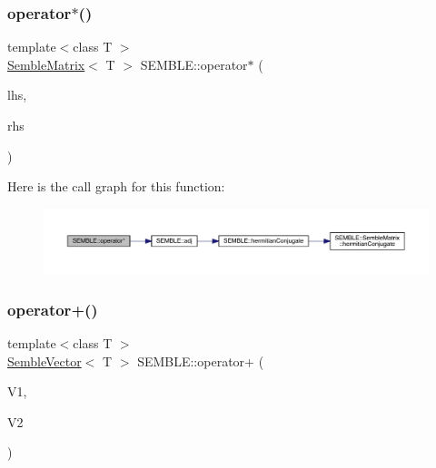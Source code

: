 \subsubsection{\texorpdfstring{operator$\ast$()}{operator*()}\hspace{0.1cm}{\footnotesize\ttfamily [20/20]}}
{\footnotesize\ttfamily template$<$class T $>$ \\
\mbox{\hyperlink{structSEMBLE_1_1SembleMatrix}{Semble\+Matrix}}$<$ T $>$ S\+E\+M\+B\+L\+E\+::operator$\ast$ (\begin{DoxyParamCaption}\item[{const itpp\+::\+Mat$<$ T $>$ \&}]{lhs,  }\item[{const \mbox{\hyperlink{structSEMBLE_1_1SembleMatrix}{Semble\+Matrix}}$<$ T $>$ \&}]{rhs }\end{DoxyParamCaption})}

Here is the call graph for this function\+:
\nopagebreak
\begin{figure}[H]
\begin{center}
\leavevmode
\includegraphics[width=350pt]{d7/dfd/namespaceSEMBLE_aa848b76b110517db4feab23c8e83a941_cgraph}
\end{center}
\end{figure}
\mbox{\label{namespaceSEMBLE_a3ae3713dc6f7ef13ce32f649e742e3ea}} 
\subsubsection{\texorpdfstring{operator+()}{operator+()}\hspace{0.1cm}{\footnotesize\ttfamily [1/6]}}
{\footnotesize\ttfamily template$<$class T $>$ \\
\mbox{\hyperlink{structSEMBLE_1_1SembleVector}{Semble\+Vector}}$<$ T $>$ S\+E\+M\+B\+L\+E\+::operator+ (\begin{DoxyParamCaption}\item[{const \mbox{\hyperlink{structSEMBLE_1_1SembleVector}{Semble\+Vector}}$<$ T $>$ \&}]{V1,  }\item[{const \mbox{\hyperlink{structSEMBLE_1_1SembleVector}{Semble\+Vector}}$<$ T $>$ \&}]{V2 }\end{DoxyParamCaption})}

